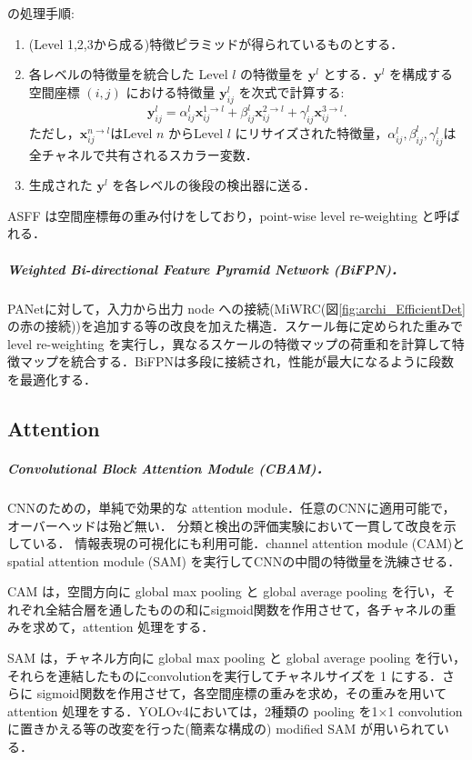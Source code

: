 \documentclass[twocolumn]{jsarticle} %
\newcommand{\vect}[1]{\boldsymbol #1}
\begin{document}
 \cite{LHW19}の処理手順:
\newcommand{\yb}[2]{\boldsymbol{y}^{#1}_{#2}}
\newcommand{\xb}[2]{\boldsymbol{x}^{#1}_{#2}}
\begin{enumerate}
    \item (Level 1,2,3から成る)特徴ピラミッドが得られているものとする．
    \item 各レベルの特徴量を統合した Level $l$ の特徴量を $\vect{y}^l$ とする．$\vect{y}^l$ を構成する空間座標 $(i,j)$ における特徴量 $\yb{l}{ij}$ を次式で計算する: $$ \yb{l}{ij} = \alpha^l_{ij}\xb{1{\rightarrow}l}{ij} + \beta^l_{ij}\xb{2{\rightarrow}l}{ij} + \gamma^l_{ij}\xb{3{\rightarrow}l}{ij}. $$ ただし，$\xb{n{\rightarrow}l}{ij}$はLevel $n$ からLevel $l$ にリサイズされた特徴量，$\alpha^l_{ij},\beta^l_{ij},\gamma^l_{ij}$は全チャネルで共有されるスカラー変数．
    \item 生成された $\vect{y}^l$ を各レベルの後段の検出器に送る．
\end{enumerate}
ASFF は空間座標毎の重み付けをしており，point-wise level re-weighting と呼ばれる．

\subparagraph{Weighted Bi-directional Feature Pyramid Network (BiFPN)\cite{TPL20}．} PANetに対して，入力から出力 node への接続(MiWRC(図\ref{fig:archi_EfficientDet}の赤の接続))を追加する等の改良を加えた構造．スケール毎に定められた重みで level re-weighting を実行し，異なるスケールの特徴マップの荷重和を計算して特徴マップを統合する．BiFPNは多段に接続され，性能が最大になるように段数を最適化する．

\subsection{Attention}
\subparagraph{Convolutional Block Attention Module (CBAM)\cite{WPLK18}．} CNNのための，単純で効果的な attention module．任意のCNNに適用可能で，オーバーヘッドは殆ど無い．
分類と検出の評価実験において一貫して改良を示している．
情報表現の可視化にも利用可能．channel attention module (CAM)とspatial attention module (SAM) を実行してCNNの中間の特徴量を洗練させる．

CAM は，空間方向に global max pooling と global average pooling を行い，それぞれ全結合層を通したものの和にsigmoid関数を作用させて，各チャネルの重みを求めて，attention 処理をする．

SAM は，チャネル方向に global max pooling と global average pooling を行い，それらを連結したものにconvolutionを実行してチャネルサイズを 1 にする．さらに sigmoid関数を作用させて，各空間座標の重みを求め，その重みを用いてattention 処理をする．YOLOv4においては，2種類の pooling を1$\times$1 convolution に置きかえる等の改変を行った(簡素な構成の) modified SAM が用いられている．
\end{document}
